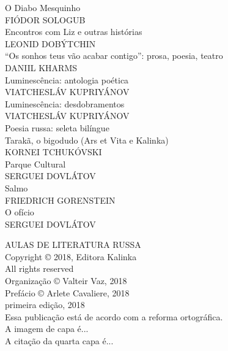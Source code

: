 \noindent{}O Diabo Mesquinho\\
FIÓDOR SOLOGUB\\

\noindent{}Encontros com Liz e outras histórias\\
LEONID DOBÝTCHIN\\

\noindent{}``Os sonhos teus vão acabar contigo'': prosa, poesia, teatro\\
DANIIL KHARMS\\

\noindent{}Luminescência: antologia poética\\
VIATCHESLÁV KUPRIYÁNOV\\

\noindent{}Luminescência: desdobramentos\\
VIATCHESLÁV KUPRIYÁNOV\\

\noindent{}Poesia russa: seleta bilíngue\\

\noindent{}Tarakã, o bigodudo (Ars et Vita e Kalinka)\\
KORNEI TCHUKÓVSKI\\

\noindent{}Parque Cultural\\
SERGUEI DOVLÁTOV\\

\noindent{}Salmo\\
FRIEDRICH GORENSTEIN\\

\noindent{}O ofício\\
SERGUEI DOVLÁTOV\\

\newpage
\pagestyle{empty}
\MyriadPro
\scriptsize
\begin{center}
AULAS DE LITERATURA RUSSA\\[6pt]

Copyright © 2018, Editora Kalinka\\[6pt]

All rights reserved\\[20pt]

Organização © Valteir Vaz, 2018\\[6pt]

Prefácio © Arlete Cavaliere, 2018\\[6pt]

primeira edição, 2018\\[40pt]


Essa publicação está de acordo com a reforma ortográfica.\\[6pt]
A imagem de capa é...\\[6pt]	
A citação da quarta capa é...\\[20pt] 
\end{center}


